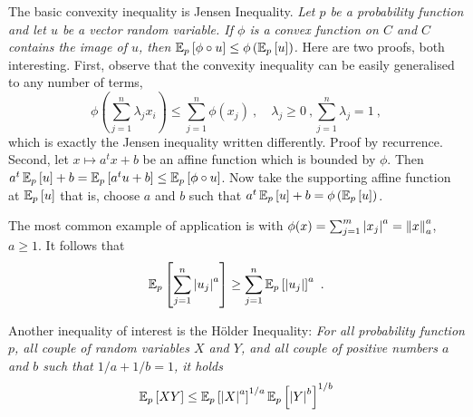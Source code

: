 \documentclass[12pt,a4paper]{amsart}
\theoremstyle{plain}%
\theoremstyle{definition}
\theoremstyle{remark}
\begin{document}
The basic convexity inequality is Jensen Inequality. \emph{Let $p$ be a probability function and let $u$ be a vector random variable. If $\phi$ is a convex function on $C$ and $C$ contains the image of $u$, then $\expectat p {\phi\circ u} \leq \phi\left(\expectat p u\right)$.} Here are two proofs, both interesting. First, observe that the convexity inequality can be easily generalised to any number of terms,
\begin{equation*}
  \phi\left(\sum_{j=1}^n \lambda_j x_i\right) \leq \sum_{j=1}^n \phi(x_j) \ , \quad \lambda_j \geq 0 \ , \sum_{j=1}^n \lambda_j = 1 \ ,
\end{equation*}
which is exactly the Jensen inequality written differently. Proof by recurrence. Second, let $x \mapsto a^tx + b$ be an affine function which is bounded by $\phi$. Then $a^t \expectat p u + b = \expectat p {a^tu+b} \leq \expectat p {\phi\circ u}$. Now take the supporting affine function at $\expectat p u$ that is, choose $a$ and $b$ such that $a^t \expectat p u + b = \phi\left(\expectat p u\right)$.

The most common example of application is with $\phi(x) = \sum_{j=1}^m \aval {x_j}^a = \normat a x ^a$, $a \geq 1$. It follows that
\begin{equation*}
  \expectat p {\sum_{j=1}^n \aval{u_j}^a} \geq \sum_{j=1}^n \expectat p {\aval{u_j}}^a \ .
\end{equation*}

Another inequality of interest is the H\"older Inequality: \emph{For all probability function $p$, all couple of random variables $X$ and $Y$, and all couple of positive numbers $a$ and $b$ such that $1/a+1/b = 1$, it holds}
\begin{equation*}
  \expectat p {XY} \leq \expectat p {\aval X ^a}^{1/a} \expectat p {\aval Y ^b}^{1/b}
\end{equation*}
\end{document}
